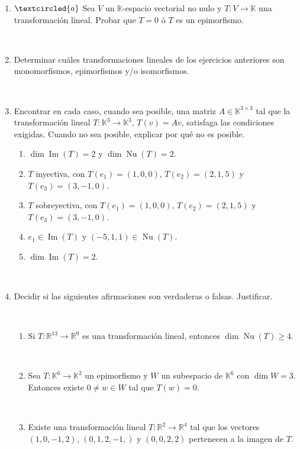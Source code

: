\documentclass[12pt]{amsart}
\begin{document}
\begin{enumerate}[resume, topsep=5pt,itemsep=5pt]
\

\item\label{funcionales} $\textcircled{a}$ Sea $V$ un $\mathbb{K}$-espacio vectorial no nulo y $T:V\longrightarrow\mathbb{K}$ una transformaci\'{o}n lineal. Probar que $T=0$ \'o $T$ es un epimorfismo.

\

\item Determinar cu\'ales transformaciones lineales de los ejercicios anteriores son monomorfismos, epimorfismos y/o isomorfismos.

\

\item Encontrar en cada caso, cuando sea posible, una matriz $A\in\mathbb{K}^{3\times 3}$ tal que la transformaci\'on lineal $T:\mathbb{K}^3\longrightarrow\mathbb{K}^3$, $T(v)=Av$, satisfaga las condiciones exigidas. Cuando no sea posible, 
    explicar por qu\'e no es posible.
	\begin{enumerate}[ topsep=5pt,itemsep=5pt]
		\item $\operatorname{dim} \operatorname{Im}(T)=2$ y $\operatorname{dim}\operatorname{Nu}(T)=2$.
		\item $T$ inyectiva, con $T(e_1)=(1,0,0)$, $T(e_2)=(2,1,5)$ y $T(e_3)=(3,-1,0)$.
		\item $T$ sobreyectiva, con $T(e_1)=(1,0,0)$, $T(e_2)=(2,1,5)$ y $T(e_3)=(3,-1,0)$.
		\item $e_1\in\operatorname{Im}(T)$ y $(-5,1,1)\in\operatorname{Nu}(T)$.
		\item $\operatorname{dim} \operatorname{Im}(T)=2$.
	\end{enumerate}
	
\

\item Decidir si las siguientes afirmaciones son verdaderas o falsas. Justificar.

\

\begin{enumerate}
\item  Si $T : \mathbb R^{13} \to \mathbb R^9$ es una transformaci\' on lineal, entonces $\dim \operatorname{Nu}(T) \geq  4$.

\

\item Sea $T:\mathbb{K}^{6}\longrightarrow\mathbb{K}^2$ un epimorfismo y $W$ un subespacio de $\mathbb{K}^{6}$ con $\dim W=3$. Entonces existe $0\neq w\in W$ tal que $T(w)=0$.

\

\item Existe una transformaci\' on lineal $T : \mathbb R^2 \to \mathbb R^4$ tal que los vectores $(1, 0, -1, 2)$, $(0, 1, 2,-1,)$ y $(0, 0, 2, 2)$ pertenecen a la imagen de $T$.

\end{enumerate}

\end{enumerate}
\end{document}
